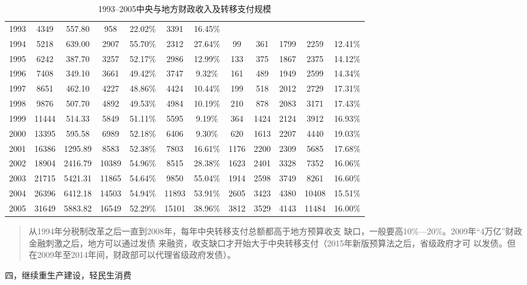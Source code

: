 \begin{table}[]
{\begin{tabular}{@{}cccccccccccc@{}}
1993 & 4349  & 557.80  & 958   & 22.02\% & 3391  & 16.45\% &      &      &      &       &         \\
1994 & 5218  & 639.00  & 2907  & 55.70\% & 2312  & 27.64\% & 99   & 361  & 1799 & 2259  & 12.41\% \\
1995 & 6242  & 387.70  & 3257  & 52.17\% & 2986  & 12.99\% & 133  & 375  & 1867 & 2375  & 14.12\% \\
1996 & 7408  & 349.10  & 3661  & 49.42\% & 3747  & 9.32\%  & 161  & 489  & 1949 & 2599  & 14.34\% \\
1997 & 8651  & 462.10  & 4227  & 48.86\% & 4424  & 10.44\% & 199  & 518  & 2012 & 2729  & 17.31\% \\
1998 & 9876  & 507.70  & 4892  & 49.53\% & 4984  & 10.19\% & 210  & 878  & 2083 & 3171  & 17.43\% \\
1999 & 11444 & 514.33  & 5849  & 51.11\% & 5595  & 9.19\%  & 364  & 1424 & 2124 & 3912  & 16.93\% \\
2000 & 13395 & 595.58  & 6989  & 52.18\% & 6406  & 9.30\%  & 620  & 1613 & 2207 & 4440  & 19.03\% \\
2001 & 16386 & 1295.89 & 8583  & 52.38\% & 7803  & 16.61\% & 1176 & 2200 & 2309 & 5685  & 17.68\% \\
2002 & 18904 & 2416.79 & 10389 & 54.96\% & 8515  & 28.38\% & 1623 & 2401 & 3328 & 7352  & 16.06\% \\
2003 & 21715 & 5421.31 & 11865 & 54.64\% & 9850  & 55.04\% & 1914 & 2598 & 3749 & 8261  & 16.60\% \\
2004 & 26396 & 6412.18 & 14503 & 54.94\% & 11893 & 53.91\% & 2605 & 3423 & 4380 & 10408 & 15.51\% \\
2005 & 31649 & 5883.82 & 16549 & 52.29\% & 15101 & 38.96\% & 3812 & 3529 & 4143 & 11484 & 16.00\% \\ \bottomrule
\end{tabular}%
}
\caption{1993--2005中央与地方财政收入及转移支付规模}
\label{tab:zhuanyi}
\end{table}


\begin{quotation}
  从1994年分税制改革之后一直到2008年，每年中央转移支付总额都高于地方预算收支
  缺口，一般要高10\%—20\%。2009年“4万亿”财政金融刺激之后，地方可以通过发债
  来融资，收支缺口才开始大于中央转移支付（2015年新版预算法之后，省级政府才可
  以发债。但在2009年至2014年间，财政部可以代理省级政府发债）。\cite{zhishenshinei}
\end{quotation}

{\heiti 四，继续重生产建设，轻民生消费}

